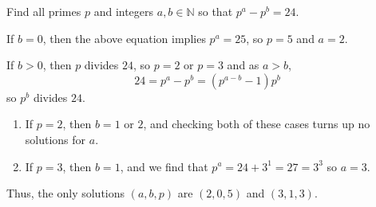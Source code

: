 \documentclass[11pt,dvipsnames]{book}
\def\N{{\mathbb{N}}}
\numberwithin{figure}{section} %
\numberwithin{table}{section} %
\begin{document}
%
%
%
%
%
%
%
%

%
%
%
%

\begin{exercise} Find all primes $p$ and integers $a,b\in\N$ so that $p^{a}-p^{b}=24$.

\begin{solution}
 If $b=0$, then the above equation implies $p^{a}=25$, so $p=5$ and $a=2$.

 If $b> 0$, then $p$ divides $24$, so $p=2$ or $p=3$ and as $a>b$,
 \[
 24 = p^{a}-p^{b} = (p^{a-b}-1)p^{b}
 \]
 so $p^{b}$ divides $24$.
 \begin{enumerate}[label=(\alph*)]
 \item If $p=2$, then $b=1$ or $2$, and checking both of these cases turns up no solutions for $a$.
 \item If $p=3$, then $b=1$, and we find that $p^{a} = 24+3^{1}=27=3^3$ so $a=3$.
 \end{enumerate}

 Thus, the only solutions $(a,b,p)$ are $(2,0,5)$ and $(3,1,3)$.

 \end{solution}

\end{exercise}
\end{document}

